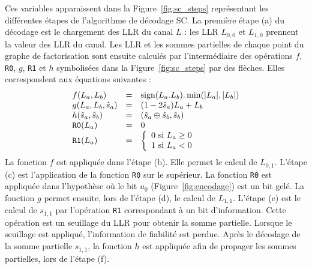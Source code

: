 Ces variables apparaissent dans la Figure~\ref{fig:sc_steps} représentant les différentes étapes de l'algorithme de décodage SC.
La première étape (a) du décodage est le chargement des LLR du canal $L$ : les LLR $L_{0,0}$ et $L_{1,0}$ prennent la valeur des LLR du canal. Les LLR et les sommes partielles de chaque point du graphe de factorisation sont ensuite calculés par l'intermédiaire des opérations $f$, \texttt{R0}, $g$, \texttt{R1} et $h$ symbolisées dans la Figure~\ref{fig:sc_steps} par des flèches. Elles correspondent aux équations suivantes :
\begin{eqnarray}
  \begin{array}{l c l}
    f(L_a,L_b) &=& \text{sign}(L_a.L_b).\min(|L_a|,|L_b|)\\
    g(L_a,L_b,\hat{s}_a)&=&(1-2\hat{s}_a)L_a+L_b\\
    h(\hat{s}_a,\hat{s}_b)&=& (\hat{s}_{a} \oplus \hat{s}_{b}, \hat{s}_{b})\\
    \texttt{R0}(L_a) &=& 0 \\
    \texttt{R1}(L_a) &=&  \left\{\begin{array}{l c l} 0 \text{ si } L_a \geq 0 \\ 1 \text{ si } L_a < 0 \end{array}\right.
  \end{array}
  \label{eq:sc}
\end{eqnarray}
La fonction $f$ est appliquée dans l'étape (b). Elle permet le calcul de $L_{0,1}$.
L'étape (c) est l'application de la fonction \texttt{R0} sur le \noeud supérieur. 
La fonction \texttt{R0} est appliquée dans l'hypothèse où le bit $u_0$ (Figure~\ref{fig:encodage}) est un bit gelé.
La fonction $g$ permet ensuite, lors de l'étape (d), le calcul de $L_{1,1}$.
L'étape (e) est le calcul de $s_{1,1}$ par l'opération \texttt{R1} correspondant à un bit d'information. 
Cette opération est un seuillage du LLR pour obtenir la somme partielle.
Lorsque le seuillage est appliqué, l'information de fiabilité est perdue.
Après le décodage de la somme partielle $s_{1,1}$, la fonction $h$ est appliquée afin de propager les sommes partielles, lors de l'étape (f).


